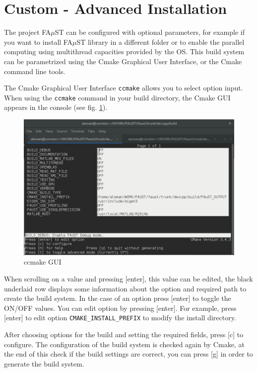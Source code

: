 \section{Custom - Advanced Installation}\label{sec:UnixCustomInstall}

The project FA$\mu$ST can be configured with optional parameters, for example if you want to install FA$\mu$ST library in a different folder or to enable the parallel computing using multithread capacities provided by the OS. This build system can be parametrized using the Cmake Graphical User Interface, or the Cmake command line tools. 

The Cmake Graphical User Interface \texttt{ccmake} allows you to select option input. When using the \texttt{ccmake} command in your build directory, the Cmake GUI appears in the console (see fig. \ref{fig:ccmake}).

\begin{figure}[!h] %
\centering
\includegraphics[scale=0.5]{images/ccmake.jpg}
\caption{ccmake GUI}
\label{fig:ccmake}
\end{figure}

When scrolling on a value and pressing [enter], this value can be edited, the black underlaid row displays some information about the option and required path to create the build system. In the case of an option press [enter] to toggle the ON/OFF values. You can edit option by pressing [enter]. For example, press [enter] to edit option \texttt{CMAKE\_INSTALL\_PREFIX} to modify the install directory. 

After choosing options for the build and setting the required fields, press [c] to configure. The configuration of the build system is checked again by Cmake, at the end of this check if the build settings are correct, you can press [g] in order to generate the build system.

